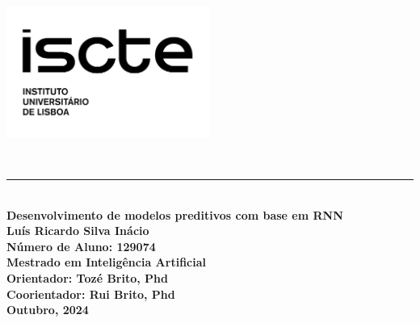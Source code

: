 \begin{titlepage}
	\begin{flushleft}
		\begin{minipage}{\textwidth}
			\vspace{1cm} %
			\includegraphics[width=0.5\textwidth]{iscte.png}
		\end{minipage}\\
	\end{flushleft}
	\noindent
	\textcolor{barraazul}{\rule{\textwidth}{1mm}} %
	\\[0.5cm]
	{\Huge \textbf{\centering Desenvolvimento de modelos preditivos com base em RNN}}\\[1.5cm]
	\noindent
	\textbf{Luís Ricardo Silva Inácio}\\
	\textbf{Número de Aluno: 129074}\\[2cm]
	\textbf{Mestrado em Inteligência Artificial}\\[1.5cm]
	\textbf{Orientador: Tozé Brito, Phd}\\
	\textbf{Coorientador: Rui Brito, Phd}\\[3cm]
	\textbf{Outubro, 2024}
\end{titlepage}
